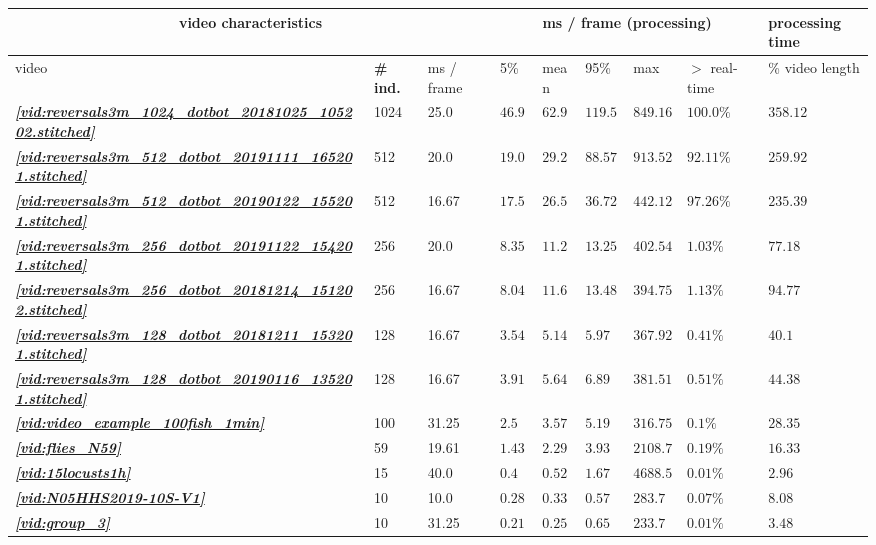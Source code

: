 \documentclass[9pt,lineno]{elife}
\newcommand{\vidref}[1]{\textit{\textbf{\ref{#1}}}}
\begin{document}
\begin{table}
\begin{tabular}{l l l | l l l l l | l}
\toprule
\multicolumn{3}{c|}{video characteristics} & \multicolumn{5}{c|}{ms / frame (processing)} & processing time \\
\midrule
video & \textbf{{\# ind.}}  & ms / frame & 5\% & mean & 95\% & max & $>$ real-time & \% video length  \\
\midrule

\rowcolor{Gray} \vidref{vid:reversals3m_1024_dotbot_20181025_105202.stitched} & 1024 & 25.0 & $ 46.93 $ & $ 62.96 $ & $ 119.54 $ & $ 849.16 $ & $ 100.0 \%$ & $ 358.12 $ \\
\rowcolor{Gray} \vidref{vid:reversals3m_512_dotbot_20191111_165201.stitched} & 512 & 20.0 & $ 19.09 $ & $ 29.26 $ & $ 88.57 $ & $ 913.52 $ & $ 92.11 \%$ & $ 259.92 $ \\
\rowcolor{Gray} \vidref{vid:reversals3m_512_dotbot_20190122_155201.stitched} & 512 & 16.67 & $ 17.51 $ & $ 26.53 $ & $ 36.72 $ & $ 442.12 $ & $ 97.26 \%$ & $ 235.39 $ \\
 \vidref{vid:reversals3m_256_dotbot_20191122_154201.stitched} & 256 & 20.0 & $ 8.35 $ & $ 11.28 $ & $ 13.25 $ & $ 402.54 $ & $ 1.03 \%$ & $ 77.18 $ \\
 \vidref{vid:reversals3m_256_dotbot_20181214_151202.stitched} & 256 & 16.67 & $ 8.04 $ & $ 11.62 $ & $ 13.48 $ & $ 394.75 $ & $ 1.13 \%$ & $ 94.77 $ \\
 \vidref{vid:reversals3m_128_dotbot_20181211_153201.stitched} & 128 & 16.67 & $ 3.54 $ & $ 5.14 $ & $ 5.97 $ & $ 367.92 $ & $ 0.41 \%$ & $ 40.1 $ \\
 \vidref{vid:reversals3m_128_dotbot_20190116_135201.stitched} & 128 & 16.67 & $ 3.91 $ & $ 5.64 $ & $ 6.89 $ & $ 381.51 $ & $ 0.51 \%$ & $ 44.38 $ \\
 \vidref{vid:video_example_100fish_1min} & 100 & 31.25 & $ 2.5 $ & $ 3.57 $ & $ 5.19 $ & $ 316.75 $ & $ 0.1 \%$ & $ 28.35 $ \\
 \vidref{vid:flies_N59} & 59 & 19.61 & $ 1.43 $ & $ 2.29 $ & $ 3.93 $ & $ 2108.77 $ & $ 0.19 \%$ & $ 16.33 $ \\
 \vidref{vid:15locusts1h} & 15 & 40.0 & $ 0.4 $ & $ 0.52 $ & $ 1.67 $ & $ 4688.5 $ & $ 0.01 \%$ & $ 2.96 $ \\
 \vidref{vid:N05HHS2019-10S-V1} & 10 & 10.0 & $ 0.28 $ & $ 0.33 $ & $ 0.57 $ & $ 283.7 $ & $ 0.07 \%$ & $ 8.08 $ \\
 \vidref{vid:group_3} & 10 & 31.25 & $ 0.21 $ & $ 0.25 $ & $ 0.65 $ & $ 233.7 $ & $ 0.01 \%$ & $ 3.48 $ \\

\end{tabular}
\end{table}
\end{document}
